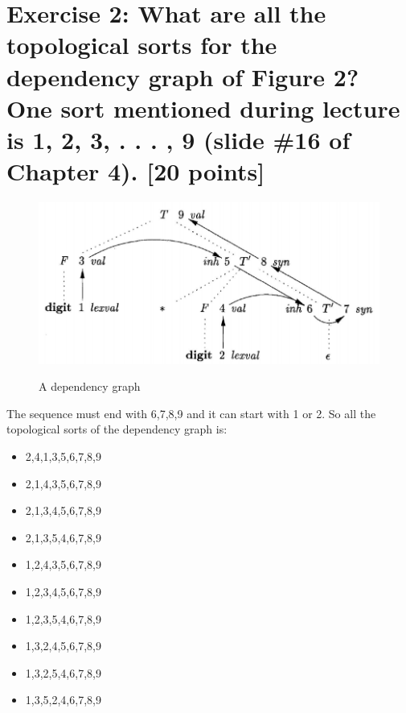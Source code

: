 \documentclass{article}
\begin{document}
    \section{Exercise 2: What are all the topological sorts for the dependency graph of Figure 2? One 
    sort mentioned during lecture is 1, 2, 3, . . . , 9 (slide \#16 of Chapter 4). [20 points]}
        \begin{figure}[H]
            \centering
            \caption{A dependency graph}
            \includegraphics[scale=0.5]{./Q2_T.png}
            \label{fig:label}
        \end{figure}
        The sequence must end with 6,7,8,9 and it can start with 1 or 2. So all the topological sorts of the dependency 
        graph is:
        \begin{itemize}
            \item 2,4,1,3,5,6,7,8,9
            \item 2,1,4,3,5,6,7,8,9
            \item 2,1,3,4,5,6,7,8,9
            \item 2,1,3,5,4,6,7,8,9
            \item 1,2,4,3,5,6,7,8,9
            \item 1,2,3,4,5,6,7,8,9
            \item 1,2,3,5,4,6,7,8,9
            \item 1,3,2,4,5,6,7,8,9
            \item 1,3,2,5,4,6,7,8,9
            \item 1,3,5,2,4,6,7,8,9
        \end{itemize}
\end{document}
